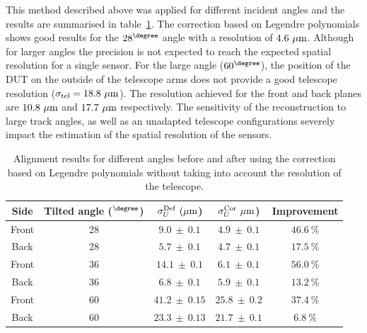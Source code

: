       This method described above was applied for different incident angles and the results are summarised in table~\ref{tab:correctionOfDeformation}. 
      The correction based on Legendre polynomials shows good results for the $28^{\degree}$ angle with a resolution of $4.6~\rm{\mu m}$.
      Although for larger angles the precision is not expected to reach the expected spatial resolution for a single sensor.
      For the large angle ($60^{\degree}$), the position of the \gls{DUT} on the outside of the telescope arms does not provide a good telescope resolution ($\sigma_{\rm{tel}} = 18.8~\rm{\mu m}$).
      The resolution achieved for the front and back planes are $10.8~\rm{\mu m}$ and $17.7~\rm{\mu m}$ respectively.
      The sensitivity of the reconstruction to large track angles, as well as an unadapted telescope configurations severely impact the estimation of the spatial resolution of the sensors.

      \begin{table}[!tbh]
        \centering
        \begin{tabular}{c c c c c}
          \hline %
          Side &  Tilted angle ($^{\degree}$)  &   $\sigma_{U}^{\rm{Def}}~(\rm{\mu m}$) &   $\sigma_{U}^{\rm{Cor}}~\rm{\mu m}$) & Improvement \\
          \hline %
          \hline %
          Front &      28       & $ 9.0 \ \pm \ 0.1 $ & $ 4.9 \ \pm \ 0.1 $ &    $46.6 \ \%$  \tabularnewline
          Back  &      28       & $ 5.7 \ \pm \ 0.1 $ & $ 4.7 \ \pm \ 0.1 $ &    $17.5 \ \%$  \tabularnewline
          \hline %
          Front &      36       & $ 14.1 \ \pm \ 0.1 $ & $ 6.1 \ \pm \ 0.1 $ &    $56.0 \ \%$ \tabularnewline
          Back  &      36       & $ 6.8 \ \pm \ 0.1 $ & $ 5.9 \ \pm \ 0.1 $ &    $13.2 \ \%$  \tabularnewline
          \hline %
          Front &      60       & $ 41.2 \ \pm \ 0.15$ & $25.8 \ \pm \ 0.2$  &    $37.4 \ \%$ \tabularnewline
          Back  &      60       & $ 23.3 \ \pm \ 0.13$ & $21.7 \ \pm \ 0.1$  &    $6.8 \ \%$  \tabularnewline
          \hline %
        \end{tabular}
        \caption{Alignment results for different angles before and after using the correction based on Legendre polynomials without taking into account the resolution of the telescope.}
        \label{tab:correctionOfDeformation}
      \end{table}


